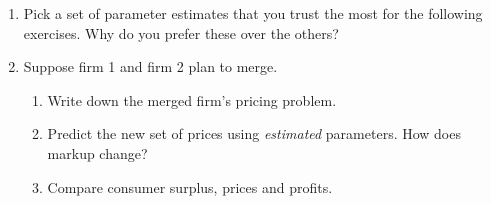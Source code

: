 \documentclass[12pt ]{article}
\begin{document}
\begin{enumerate}
\item Pick a set of parameter estimates that you trust the most for
  the following exercises. Why do you prefer these over the others?
\item Suppose firm 1 and firm 2 plan to merge.
  \begin{enumerate}
  \item Write down the merged firm's pricing problem.
  \item Predict the new set of prices using \emph{estimated}
    parameters. How does markup change?
  \item Compare consumer surplus, prices and profits.
  \end{enumerate}
\end{enumerate}
\end{document}
